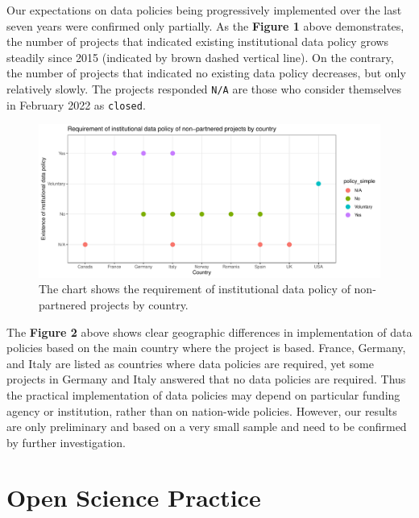 \documentclass[
  12pt,
]{scrreprt}
\begin{document}
\normalsize

Our expectations on data policies being progressively implemented over
the last seven years were confirmed only partially. As the
\textbf{Figure 1} above demonstrates, the number of projects that
indicated existing institutional data policy grows steadily since 2015
(indicated by brown dashed vertical line). On the contrary, the number
of projects that indicated no existing data policy decreases, but only
relatively slowly. The projects responded \texttt{N/A} are those who
consider themselves in February 2022 as \texttt{closed}.

\footnotesize

\normalsize

\footnotesize

\begin{figure}

{\centering \includegraphics{01_FAIR_epi_report_files/figure-latex/unnamed-chunk-37-1} 

}

\caption{The chart shows the requirement of institutional data policy of non-partnered projects by country.}\label{fig:unnamed-chunk-37}
\end{figure}

\normalsize \newpage

The \textbf{Figure 2} above shows clear geographic differences in
implementation of data policies based on the main country where the
project is based. France, Germany, and Italy are listed as countries
where data policies are required, yet some projects in Germany and Italy
answered that no data policies are required. Thus the practical
implementation of data policies may depend on particular funding agency
or institution, rather than on nation-wide policies. However, our
results are only preliminary and based on a very small sample and need
to be confirmed by further investigation.

\hypertarget{open-science-practice-1}{%
\section{Open Science Practice}\label{open-science-practice-1}}
\end{document}
